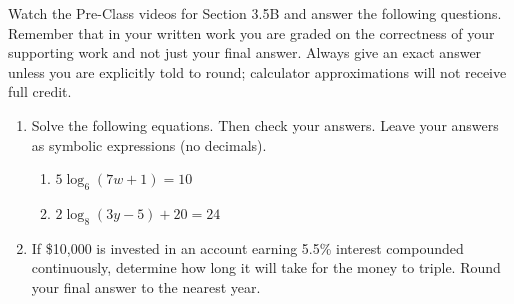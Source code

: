 


\noindent Watch the Pre-Class videos for Section 3.5B and answer the following questions. Remember that in your written work you are graded on the correctness of your supporting work and not just your final answer. Always give an exact answer unless you are explicitly told to round; calculator approximations will not receive full credit. 


\begin{enumerate}
\item  Solve the following equations.  Then check your answers.  Leave your answers as symbolic expressions (no decimals).
\begin{enumerate}
\item $\displaystyle 5\log_6(7w+1)=10$
\vfill
\item $2\log_8(3y-5)+20=24$
\vfill


\end{enumerate}

\newpage

\item If \$10,000 is invested in an account earning 5.5\% interest compounded continuously, determine how long it will take for the money to triple.  Round your final answer to the nearest year.




\end{enumerate}



